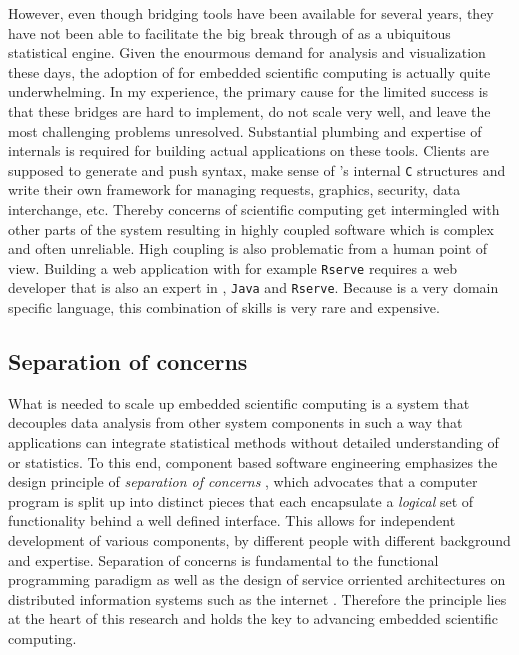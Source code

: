 However, even though bridging tools have been available for several years, they have not been able to facilitate the big break through of \R as a ubiquitous statistical engine. Given the enourmous demand for analysis and visualization these days, the adoption of \R for embedded scientific computing is actually quite underwhelming. In my experience, the primary cause for the limited success is that these bridges are hard to implement, do not scale very well, and leave the most challenging problems unresolved. Substantial plumbing and expertise of \R internals is required for building actual applications on these tools. Clients are supposed to generate and push \R syntax, make sense of \R's internal \texttt{C} structures and write their own framework for managing requests, graphics, security, data interchange, etc. Thereby concerns of scientific computing get intermingled with other parts of the system resulting in highly coupled software which is complex and often unreliable. High coupling is also problematic from a human point of view. Building a web application with for example \texttt{Rserve} requires a web developer that is also an expert in \R, \texttt{Java} and \texttt{Rserve}. Because \R is a very domain specific language, this combination of skills is very rare and expensive. 


\subsection{Separation of concerns}

What is needed to scale up embedded scientific computing is a system that decouples data analysis from other system components in such a way that applications can integrate statistical methods without detailed understanding of \R or statistics. To this end, component based software engineering emphasizes the design principle of \emph{separation of concerns} \citep{heineman2001component}, which advocates that a computer program is split up into distinct pieces that each encapsulate a \emph{logical} set of functionality behind a well defined interface. This allows for independent development of various components, by different people with different background and expertise. Separation of concerns is fundamental to the functional programming paradigm \citep{reade1989elements} as well as the design of service orriented architectures on distributed information systems such as the internet \citep{fielding2000architectural}. Therefore the principle lies at the heart of this research and holds the key to advancing embedded scientific computing.

